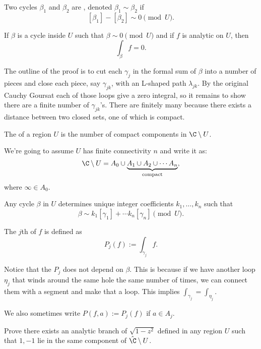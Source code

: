\begin{definition}
    Two cycles $\beta_1$ and $\beta_2$ are , denoted $\beta_1 \sim \beta_2$ if
    \[ [\beta_1] - [\beta_2] \sim 0 \pmod{U}. \]
\end{definition}

\begin{theorem}
    If $\beta$ is a cycle inside $U$ such that $\beta \sim 0
    \pmod{U}$ and if $f$ is analytic on $U$, then
    \[ \int_{\beta} f = 0. \]
\end{theorem}

The outline of the proof is to cut each $\gamma_j$ in the formal sum
of $\beta$ into a number of pieces and close each piece,
say $\gamma_{jk}$, with an L-shaped path $\lambda_{jk}$.
By the original Cauchy Goursat each of those loops give a zero integral,
so it remains to show there are a finite number of $\gamma_{jk}$'s.
There are finitely many because there exists a distance between two
closed sets, one of which is compact.

\begin{definition}
    The  of a region $U$ is the number of compact
    components in $\C \setminus U$.
\end{definition}

We're going to assume $U$ has finite connectivity $n$ and write it as:
\[ \C \setminus U = A_0 \cup \underbrace{A_1 \cup A_2 \cup \cdots A_n}_{\text{compact}}, \]
where $\infty \in A_0$.

\begin{theorem}
    Any cycle $\beta$ in $U$ determines unique integer
    coefficients $k_1, \ldots, k_n$ such that
    \[ \beta \sim k_1[\gamma_1] + \cdots k_n[\gamma_n]
    \pmod{U}. \]
\end{theorem}

\begin{definition}
    The $j$th  of $f$ is defined as
    \[ P_j(f) := \int_{\gamma_j} f. \]
\end{definition}
Notice that the $P_j$ does not depend on $\beta$.
This is because if we have another loop $\eta_j$ that winds around the same hole the
same number of times, we can connect them with a segment and make that
a loop.  This implies $\int_{\gamma_j} = \int_{\eta_j}$.

We also sometimes write $P(f, a) := P_j(f)$ if $a \in A_j$.

\begin{problem*}
    Prove there exists an analytic branch of $\sqrt{1-z^2}$ defined
    in any region $U$ such that $1, -1$ lie in the same component
    of $\hat{\C} \setminus U$.
\end{problem*}

